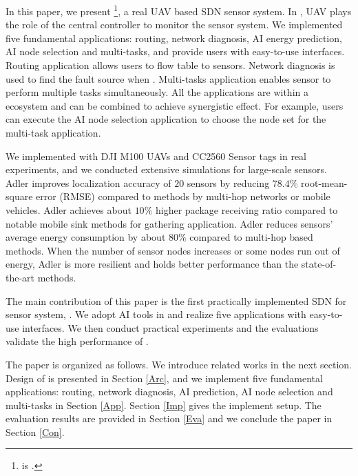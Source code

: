 In this paper, we present {\sdn}\footnote{{\sdn} is .}, 
a real UAV based SDN sensor system.
In {\sdn}, UAV plays the role of the central controller to monitor the sensor system.
We implemented five fundamental applications: routing, network diagnosis, 
AI energy prediction, AI node selection and multi-tasks,
and provide users with easy-to-use interfaces.
Routing application allows users to flow table to sensors.
Network diagnosis is used to find the fault source when .
Multi-tasks application enables sensor to perform multiple 
tasks simultaneously. All the applications are within a ecosystem
and can be combined to achieve synergistic effect. For example,
users can execute the AI node selection application to choose
the node set for the multi-task application. 


We implemented {\sdn} with DJI M100 UAVs and CC2560 Sensor tags in real experiments, and we conducted extensive simulations for large-scale sensors.
Adler improves localization accuracy of $20$ sensors by reducing $78.4\%$ root-mean-square error (RMSE) compared to methods by multi-hop networks or mobile vehicles. Adler achieves about $10\%$ higher package receiving ratio compared to notable mobile sink methods for gathering application. Adler reduces sensors' average energy consumption by about $80\%$ compared to multi-hop based methods. When the number of sensor nodes increases or some nodes run out of energy, Adler is more resilient and holds better performance than the state-of-the-art methods.

The main contribution of this paper is the first practically implemented SDN for sensor system, {\sdn}. 
We adopt AI tools in {\sdn} and realize five applications with easy-to-use interfaces.
We then conduct practical experiments and the evaluations validate the high performance of {\sdn}.

The paper is organized as follows. We introduce related works in the next section. 
Design of {\sdn} is presented in Section \ref{Arc}, 
and we implement five fundamental applications: routing, network diagnosis, 
AI prediction, AI node selection and multi-tasks in Section \ref{App}. 
Section \ref{Imp} gives the implement setup.
The evaluation results are provided in Section \ref{Eva} 
and we conclude the paper in Section \ref{Con}.


